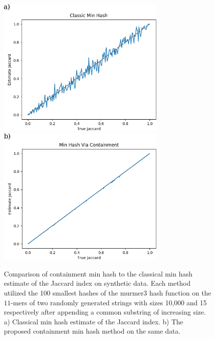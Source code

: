 \documentclass[11pt]{amsart}
\theoremstyle{remark}
\numberwithin{equation}{section}
\newcommand{\themethod}{containment min hash }
\begin{document}
\begin{figure}[!h]%
\begin{center}
\includegraphics[width=3.25in,trim={0 0 0 0in},clip]{Figs/TrueVsEstimate.png}%
\includegraphics[width=3.25in,trim={0 0 0 0in},clip]{Figs/ContainmentTrueVsEstimate.png}
\end{center}
\caption{Comparison of \themethod to the classical min hash estimate of the Jaccard index on synthetic data. Each method utilized the 100 smallest hashes of the murmer3 hash function on the $11$-mers of two randomly generated strings with sizes 10,000 and 15 respectively after appending a common substring of increasing size. a) Classical min hash estimate of the Jaccard index. b) The proposed \themethod method on the same data.}
\label{fig:TrueVsEstimate}%
\end{figure}
\end{document}
